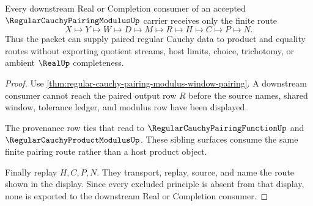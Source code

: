 \begin{theorem}
\label{thm:regular-cauchy-pairing-modulus-downstream-use}
Every downstream Real or Completion consumer of an accepted $\RegularCauchyPairingModulusUp$ carrier receives only the finite route
$$
X\longmapsto Y\longmapsto W\longmapsto D\longmapsto M\longmapsto R\longmapsto H\longmapsto C\longmapsto P\longmapsto N .
$$
Thus the packet can supply paired regular Cauchy data to product and equality routes without exporting quotient streams, host limits, choice, trichotomy, or ambient $\RealUp$ completeness.
\end{theorem}
\begin{proof}
Use \autoref{thm:regular-cauchy-pairing-modulus-window-pairing}. A downstream consumer cannot reach the paired output row $R$ before the source names, shared window, tolerance ledger, and modulus row have been displayed.

The provenance row ties that read to $\RegularCauchyPairingFunctionUp$ and $\RegularCauchyProductModulusUp$. These sibling surfaces consume the same finite pairing route rather than a host product object.

Finally replay $H,C,P,N$. They transport, replay, source, and name the route shown in the display. Since every excluded principle is absent from that display, none is exported to the downstream Real or Completion consumer.
\end{proof}





